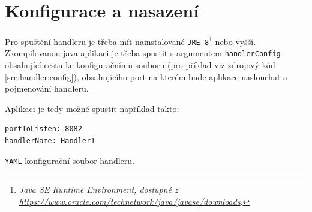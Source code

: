 \section{Konfigurace a nasazení}\label{chap:handler:config}
Pro spuštění handleru je třeba mít nainstalované \texttt{JRE 8}\footnote{\textit{Java SE Runtime Environment, dostupné z\\\url{https://www.oracle.com/technetwork/java/javase/downloads}}.} nebo vyšší.
Zkompilovanou java aplikaci je třeba spustit s argumentem \texttt{handlerConfig} obsahující cestu ke konfiguračnímu souboru (pro příklad viz zdrojový kód \ref{src:handler:config}), obsahujícího port na kterém bude aplikace naslouchat a pojmenování handleru.

Aplikaci je tedy možné spustit například takto: 

\begin{code}[h]
  \begin{verbatim}
portToListen: 8082
handlerName: Handler1
\end{verbatim}
\caption{\texttt{YAML} konfigurační soubor handleru.}
\label{src:handler:config}
\end{code}